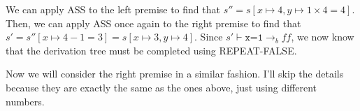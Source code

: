 We can apply ASS to the left premise to find that $s'' = s[x \mapsto 4, y \mapsto 1 \times 4 = 4]$. Then, we can apply ASS once again to the right premise to find that $s' = s''[x \mapsto 4 - 1 = 3] = s[x \mapsto 3, y \mapsto 4]$. Since $s' \vdash \texttt{x=1} \rightarrow_b \textit{ff}$, we now know that the derivation tree must be completed using REPEAT-FALSE.

\begin{center}
    \vspace{0.25cm}
    \begin{prooftree}


    \end{prooftree}
    \vspace{0.25cm}
\end{center}

Now we will consider the right premise in a similar fashion. I'll skip the details because they are exactly the same as the ones above, just using different numbers.

\begin{center}
    \vspace{0.25cm}
    \begin{prooftree}








    \end{prooftree}
    \vspace{0.25cm}
\end{center}

